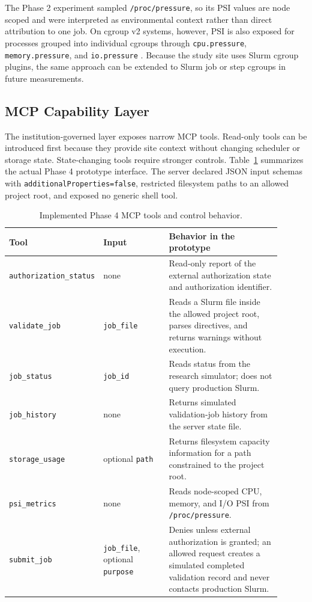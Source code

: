 \documentclass[11pt]{article}
\begin{document}
The Phase 2 experiment sampled \texttt{/proc/pressure}, so its PSI values are node scoped and were interpreted as environmental context rather than direct attribution to one job. On cgroup v2 systems, however, PSI is also exposed for processes grouped into individual cgroups through \texttt{cpu.pressure}, \texttt{memory.pressure}, and \texttt{io.pressure} \citep{linuxcgroupv2}. Because the study site uses Slurm cgroup plugins, the same approach can be extended to Slurm job or step cgroups in future measurements.

\subsection{MCP Capability Layer}

The institution-governed layer exposes narrow MCP tools. Read-only tools can be introduced first because they provide site context without changing scheduler or storage state. State-changing tools require stronger controls. Table~\ref{tab:mcp-tools} summarizes the actual Phase 4 prototype interface. The server declared JSON input schemas with \texttt{additionalProperties=false}, restricted filesystem paths to an allowed project root, and exposed no generic shell tool.

\begin{table}[H]
\centering
\caption{Implemented Phase 4 MCP tools and control behavior.}
\label{tab:mcp-tools}
\small
\begin{tabular}{p{0.22\linewidth}p{0.25\linewidth}p{0.43\linewidth}}
\toprule
\textbf{Tool} & \textbf{Input} & \textbf{Behavior in the prototype} \\
\midrule
\texttt{authorization\_status} & none & Read-only report of the external authorization state and authorization identifier. \\
\texttt{validate\_job} & \texttt{job\_file} & Reads a Slurm file inside the allowed project root, parses directives, and returns warnings without execution. \\
\texttt{job\_status} & \texttt{job\_id} & Reads status from the research simulator; does not query production Slurm. \\
\texttt{job\_history} & none & Returns simulated validation-job history from the server state file. \\
\texttt{storage\_usage} & optional \texttt{path} & Returns filesystem capacity information for a path constrained to the project root. \\
\texttt{psi\_metrics} & none & Reads node-scoped CPU, memory, and I/O PSI from \texttt{/proc/pressure}. \\
\texttt{submit\_job} & \texttt{job\_file}, optional \texttt{purpose} & Denies unless external authorization is granted; an allowed request creates a simulated completed validation record and never contacts production Slurm. \\
\bottomrule
\end{tabular}
\end{table}
\end{document}
